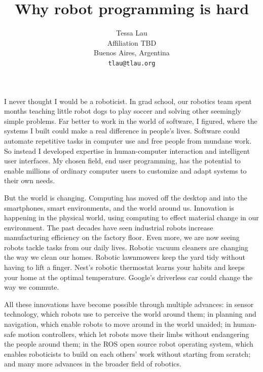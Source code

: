 \documentclass[10pt,twocolumn]{article}
\begin{document}
\title {Why robot programming is hard}
\author {Tessa Lau \\
Affiliation TBD \\
Buenos Aires, Argentina \\
{\tt tlau@tlau.org}
}
\maketitle





I never thought I would be a roboticist. In grad school, our robotics team spent months teaching little robot dogs to play soccer and solving other seemingly simple problems. Far better to work in the world of software, I figured, where the systems I built could make a real difference in people's lives. Software could automate repetitive tasks in computer use and free people from mundane work. So instead I developed expertise in human-computer interaction and intelligent user interfaces. My chosen field, end user programming, has the potential to enable millions of ordinary computer users to customize and adapt systems to their own needs.

But the world is changing. Computing has moved off the desktop and into the smartphones, smart environments, and the world around us. Innovation is happening in the physical world, using computing to effect material change in our environment. The past decades have seen industrial robots increase manufacturing efficiency on the factory floor. Even more, we are now seeing robots tackle tasks from our daily lives. Robotic vacuum cleaners are changing the way we clean our homes. Robotic lawnmowers keep the yard tidy without having to lift a finger. Nest's robotic thermostat learns your habits and keeps your home at the optimal temperature. Google's driverless car could change the way we commute.

All these innovations have become possible through multiple advances: in sensor technology, which robots use to perceive the world around them; in planning and navigation, which enable robots to move around in the world unaided; in human-safe motion controllers, which let robots move their limbs without endangering the people around them; in the ROS open source robot operating system, which enables roboticists to build on each others' work without starting from scratch; and many more advances in the broader field of robotics.
\end{document}

